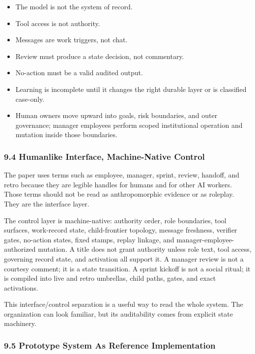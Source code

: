 \documentclass[
]{article}
\providecommand{\tightlist}{%
  \setlength{\itemsep}{0pt}\setlength{\parskip}{0pt}}
\begin{document}
\begin{itemize}
\tightlist
\item
  The model is not the system of record.
\item
  Tool access is not authority.
\item
  Messages are work triggers, not chat.
\item
  Review must produce a state decision, not commentary.
\item
  No-action must be a valid audited output.
\item
  Learning is incomplete until it changes the right durable layer or is classified case-only.
\item
  Human owners move upward into goals, risk boundaries, and outer governance; manager employees perform scoped institutional operation and mutation inside those boundaries.
\end{itemize}

\subsubsection{9.4 Humanlike Interface, Machine-Native Control}\label{humanlike-interface-machine-native-control}

The paper uses terms such as employee, manager, sprint, review, handoff, and retro because they are legible handles for humans and for other AI workers. Those terms should not be read as anthropomorphic evidence or as roleplay. They are the interface layer.

The control layer is machine-native: authority order, role boundaries, tool surfaces, work-record state, child-frontier topology, message freshness, verifier gates, no-action states, fixed stamps, replay linkage, and manager-employee-authorized mutation. A title does not grant authority unless role text, tool access, governing record state, and activation all support it. A manager review is not a courtesy comment; it is a state transition. A sprint kickoff is not a social ritual; it is compiled into live and retro umbrellas, child paths, gates, and exact activations.

This interface/control separation is a useful way to read the whole system. The organization can look familiar, but its auditability comes from explicit state machinery.

\subsubsection{9.5 Prototype System As Reference Implementation}\label{prototype-system-as-reference-implementation}
\end{document}

